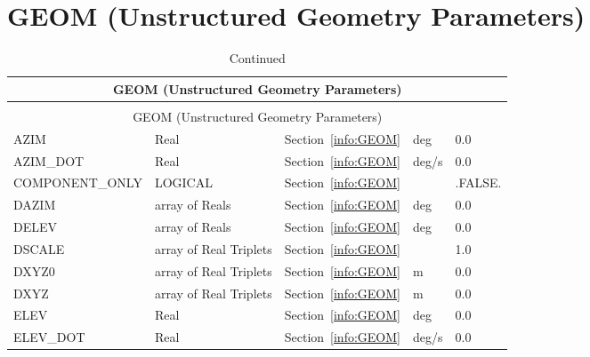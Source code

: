 \documentclass[12pt]{article}
\begin{document}
\vspace{\baselineskip}

\section{\texorpdfstring{{\ct GEOM}}{GEOM} (Unstructured Geometry Parameters)}

\begin{longtable}{@{\extracolsep{\fill}}|l|l|l|l|l|}
\caption[Unstructured geometry parameters ({\ct GEOM} namelist group)]{For more information see Section~\ref{info:GEOM}.}
\label{tbl:GEOM} \\
\hline
\multicolumn{5}{|c|}{{\ct GEOM} (Unstructured Geometry Parameters)} \\
\hline \hline
\endfirsthead
\caption[]{Continued} \\
\hline
\multicolumn{5}{|c|}{{\ct GEOM} (Unstructured Geometry Parameters)} \\
\hline \hline
\endhead
{\ct AZIM}         & Real                   & Section~\ref{info:GEOM}            &  deg      &    0.0                   \\ \hline
{\ct AZIM\_DOT}    & Real                   & Section~\ref{info:GEOM}            &  deg/s    &    0.0                   \\ \hline
{\ct COMPONENT\_ONLY} & LOGICAL             & Section~\ref{info:GEOM}            &           &  {\ct .FALSE.}           \\ \hline
{\ct DAZIM}        & array of Reals         & Section~\ref{info:GEOM}            &  deg      &    0.0                   \\ \hline
{\ct DELEV}        & array of Reals         & Section~\ref{info:GEOM}            &  deg      &    0.0                   \\ \hline
{\ct DSCALE}       & array of Real Triplets & Section~\ref{info:GEOM}            &           &   1.0                    \\ \hline
{\ct DXYZ0}        & array of Real Triplets & Section~\ref{info:GEOM}            &   m       &   0.0                    \\ \hline
{\ct DXYZ}         & array of Real Triplets & Section~\ref{info:GEOM}            &   m       &   0.0                    \\ \hline
{\ct ELEV}         & Real                   & Section~\ref{info:GEOM}            &  deg      &    0.0                   \\ \hline
{\ct ELEV\_DOT}    & Real                   & Section~\ref{info:GEOM}            &  deg/s    &    0.0                   \\ \hline

\end{longtable}
\end{document}
